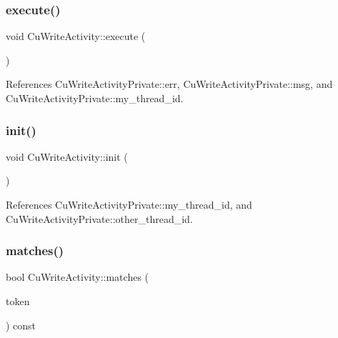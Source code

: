 \mbox{\label{classCuWriteActivity_a6d8a87364002b18f420c9302c20d4a96}} 
\subsubsection{execute()}
{\footnotesize\ttfamily void Cu\+Write\+Activity\+::execute (\begin{DoxyParamCaption}{ }\end{DoxyParamCaption})\hspace{0.3cm}{\ttfamily [protected]}}



References Cu\+Write\+Activity\+Private\+::err, Cu\+Write\+Activity\+Private\+::msg, and Cu\+Write\+Activity\+Private\+::my\+\_\+thread\+\_\+id.

\mbox{\label{classCuWriteActivity_a0a0cde69cbe5f3e6dc1d633bf62fd204}} 
\subsubsection{init()}
{\footnotesize\ttfamily void Cu\+Write\+Activity\+::init (\begin{DoxyParamCaption}{ }\end{DoxyParamCaption})\hspace{0.3cm}{\ttfamily [protected]}}



References Cu\+Write\+Activity\+Private\+::my\+\_\+thread\+\_\+id, and Cu\+Write\+Activity\+Private\+::other\+\_\+thread\+\_\+id.

\mbox{\label{classCuWriteActivity_a6887775a9b2490d65541e67f9ac25e2b}} 
\subsubsection{matches()}
{\footnotesize\ttfamily bool Cu\+Write\+Activity\+::matches (\begin{DoxyParamCaption}\item[{const Cu\+Data \&}]{token }\end{DoxyParamCaption}) const}

\mbox{\label{classCuWriteActivity_a3266335817f6907435a8e9b3e54c36f6}} 
